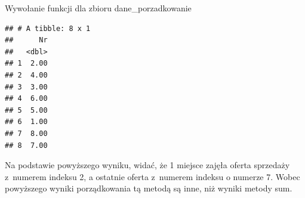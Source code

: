 \documentclass[12pt,a4paper]{report}
\begin{document}
{\begin{Shaded}
\begin{Highlighting}[]
    \NormalTok{\}}
    \NormalTok{x[,}\NormalTok{] <-}
    \NormalTok{:}
    \NormalTok{\{}
      \NormalTok{x[i,}\NormalTok{(x)]=}\NormalTok{-(odleg[i,}\NormalTok{]/d_0)}
    \NormalTok{\}}
    \NormalTok{x<-x[}\NormalTok{(-x$zmienna_syntetyczna),]}
    \NormalTok{(x[}\NormalTok{])}
    \NormalTok{\}}
\end{Highlighting}
\end{Shaded}%
Wywołanie funkcji dla zbioru dane\_porzadkowanie 
\begin{Shaded}
\begin{Highlighting}[]
\end{Highlighting}
\end{Shaded}
\begin{verbatim}
## # A tibble: 8 x 1
##      Nr
##   <dbl>
## 1  2.00
## 2  4.00
## 3  3.00
## 4  6.00
## 5  5.00
## 6  1.00
## 7  8.00
## 8  7.00
\end{verbatim}

Na podstawie powyższego wyniku, widać, że 1 miejsce zajęła oferta
sprzedaży z~numerem indeksu 2, a ostatnie oferta z~numerem indeksu o
numerze 7. Wobec powyższego wyniki porządkowania tą metodą są inne, niż wyniki metody sum. 
}
\end{document}
